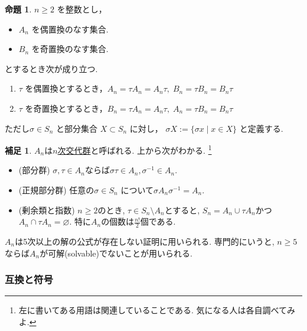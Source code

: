 \documentclass[dvipdfmx,a4paper,11pt]{article} %
\theoremstyle{definition}
\newtheorem{prop}[thm]{命題}
\newtheorem{rem}[thm]{補足}
\begin{document}
\begin{prop}
\cite[命題 3.1.8]{O}
\( n\geq 2 \) を整数とし， 
\begin{itemize}
\item \( A_n \) を偶置換のなす集合. 
\item \( B_n \) を奇置換のなす集合. 
\end{itemize}
とするとき次が成り立つ. 
\begin{enumerate}
\item \( \tau \) を偶置換とするとき，\( A_n=\tau A_n=A_n\tau,\; B_n=\tau B_n=B_n\tau \)
\item \( \tau \) を奇置換とするとき，\( B_n=\tau A_n=A_n\tau,\; A_n=\tau B_n=B_n\tau \)
\end{enumerate}
ただし\( \sigma\in S_n \) と部分集合 \( X\subset S_n \) に対し，
\(\sigma X :=\{ \sigma x \mid x \in X \} \)
と定義する. 

\end{prop}

\begin{rem}
$A_n$は\underline{$n$次交代群}と呼ばれる. 
上から次がわかる. \footnote{左に書いてある用語は関連していることである. 気になる人は各自調べてみよ.} 
\begin{itemize}
\item (部分群) $\sigma, \tau \in A_n$ならば$\sigma \tau \in A_n, \sigma^{-1} \in A_n$.
\item (正規部分群) 任意の$\sigma \in S_n$
について$\sigma A_n \sigma^{-1} =A_n$.
\item (剰余類と指数) $n \ge 2$のとき, $\tau \in S_n \setminus A_n$とすると, $S_n = A_n \cup \tau A_n$かつ$A_n \cap \tau A_n = \varnothing$. 特に$A_n$の個数は$\frac{n!}{2}$個である. 
\end{itemize}

$A_n$は5次以上の解の公式が存在しない証明に用いられる. 
専門的にいうと, $n \ge 5$ならば$A_n$が可解(solvable)でないことが用いられる. 
\end{rem}


\subsubsection{互換と符号}
\end{document}
